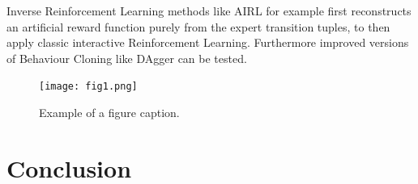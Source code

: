 \documentclass[conference]{IEEEtran}
\begin{document}
Inverse Reinforcement Learning methods like AIRL for example first reconstructs an artificial reward function purely from the expert transition tuples, to then apply classic interactive Reinforcement Learning. Furthermore improved versions of Behaviour Cloning like DAgger can be tested.

\begin{figure}[t]
\centerline{\texttt{[image: fig1.png]}}
\caption{Example of a figure caption.}
\label{fig}
\end{figure}
\section{Conclusion}




\end{document}
